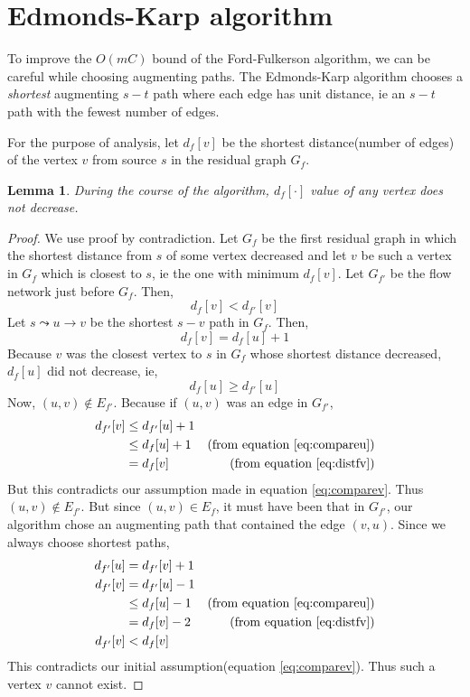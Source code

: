 \documentclass[10pt]{article}
\newtheorem{lemma}[theorem]{Lemma}
\begin{document}
\section*{Edmonds-Karp algorithm}
To improve the $O(mC)$ bound of the Ford-Fulkerson algorithm, we can be careful while choosing augmenting paths. The Edmonds-Karp algorithm chooses a \emph{shortest} augmenting $s-t$ path where each edge has unit distance, ie an $s-t$ path with the fewest number of edges.

For the purpose of analysis, let $d_f[v]$ be the shortest distance(number of edges) of the vertex $v$ from source $s$ in the residual graph $G_f$.

\begin{lemma}
During the course of the algorithm, $d_f[\cdot]$ value of any vertex does not decrease.
\end{lemma}
\begin{proof}
We use proof by contradiction. Let $G_f$ be the first residual graph in which the shortest distance from $s$ of some vertex decreased and let $v$ be such a vertex in $G_f$ which is closest to $s$, ie the one with minimum $d_f[v]$. Let $G_{f'}$ be the flow network just before $G_f$. Then, 
\begin{equation}
\label{eq:comparev}
d_f[v] < d_{f'}[v]
\end{equation}
Let $s \leadsto u \rightarrow v$ be the shortest $s-v$ path in $G_f$. Then,
\begin{equation}
\label{eq:distfv}
d_f[v] = d_f[u] + 1
\end{equation}
Because $v$ was the closest vertex to $s$ in $G_f$ whose shortest distance decreased, $d_f[u]$ did not decrease, ie,
\begin{equation}
\label{eq:compareu}
d_f[u] \geq d_{f'}[u]
\end{equation}
Now, $(u,v) \notin E_{f'}$. Because if $(u,v)$ was an edge in $G_{f'}$,
\begin{align*}
d_{f'}[v]   & \leq d_{f'}[u] + 1    & \\
            & \leq d_f[u] + 1       & \text{(from equation \ref{eq:compareu})} \\ 
            & = d_f[v]              & \text{(from equation \ref{eq:distfv})} \\
\end{align*}
But this contradicts our assumption made in equation \ref{eq:comparev}. Thus $(u,v) \notin E_{f'}$. But since $(u,v) \in E_f$, it must have been that in $G_{f'}$, our algorithm chose an augmenting path that contained the edge $(v,u)$. Since we always choose shortest paths, 
\begin{align*}
d_{f'}[u]   & = d_{f'}[v] + 1    & \\
d_{f'}[v]   & = d_{f'}[u] - 1    & \\
            & \leq d_f[u] - 1    & \text{(from equation \ref{eq:compareu})} \\ 
            & = d_f[v] - 2       & \text{(from equation \ref{eq:distfv})} \\ 
d_{f'}[v]   & < d_f[v]          & \\
\end{align*}
This contradicts our initial assumption(equation \ref{eq:comparev}). Thus such a vertex $v$ cannot exist.
\end{proof}
\end{document}

